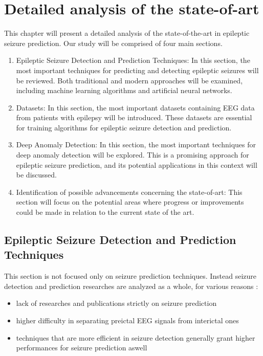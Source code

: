 \chapter{Detailed analysis of the state-of-art} \label{cpt:state-of-art}

This chapter will present a detailed analysis of the state-of-the-art in epileptic seizure prediction. Our study will be comprised of four main sections.

\begin{enumerate}
    \item Epileptic Seizure Detection and Prediction Techniques: In this section, the most important techniques for predicting and detecting epileptic seizures will be reviewed. Both traditional and modern approaches will be examined, including machine learning algorithms and artificial neural networks.

    \item Datasets: In this section, the most important datasets containing \gls{EEG} data from patients with epilepsy will be introduced. These datasets are essential for training algorithms for epileptic seizure detection and prediction.

    \item Deep Anomaly Detection: In this section, the most important techniques for deep anomaly detection will be explored. This is a promising approach for epileptic seizure prediction, and its potential applications in this context will be discussed.

    \item Identification of possible advancements concerning the state-of-art: This section will focus on the potential areas where progress or improvements could be made in relation to the current state of the art.
\end{enumerate}

\section{Epileptic Seizure Detection and Prediction Techniques}
This section is not focused only on seizure prediction techniques. Instead seizure detection and prediction researches are analyzed as a whole, for various reasons \cite{gadhoumi_seizure_2016, bou_assi_towards_2017, natu_review_2022}:

\begin{itemize}
    \item lack of researches and publications strictly on seizure prediction 
    \item higher difficulty in separating preictal \gls{EEG} signals from interictal ones
    \item techniques that are more efficient in seizure detection generally grant higher performances for seizure prediction aswell
\end{itemize}

